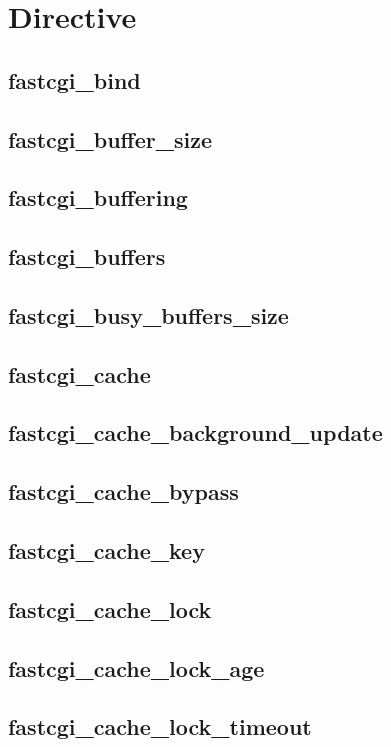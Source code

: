 \chapter{Directive}



\section{fastcgi\_bind}



\section{fastcgi\_buffer\_size}
\section{fastcgi\_buffering}
\section{fastcgi\_buffers}
\section{fastcgi\_busy\_buffers\_size}
\section{fastcgi\_cache}
\section{fastcgi\_cache\_background\_update}
\section{fastcgi\_cache\_bypass}
\section{fastcgi\_cache\_key}
\section{fastcgi\_cache\_lock}
\section{fastcgi\_cache\_lock\_age}
\section{fastcgi\_cache\_lock\_timeout}
